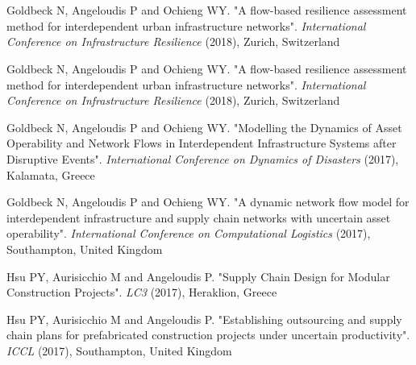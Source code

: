 \documentclass[margin]{res}
\begin{document}
\begin{resume}
\nocite{*}

\section{}
\printbibliography[heading=none,type=article,resetnumbers=true]

\section{}
\printbibliography[heading=none,type=book,resetnumbers=true]

\section{}
\begin{etaremune}
\renewcommand\labelenumi{C\theenumi. }
	\item
	{Goldbeck N, Angeloudis P and Ochieng WY}. "{A flow-based resilience assessment method for interdependent urban infrastructure networks}". \textit{International Conference on Infrastructure Resilience} (2018), Zurich, Switzerland
	\item
	{Goldbeck N, Angeloudis P and Ochieng WY}. "{A flow-based resilience assessment method for interdependent urban infrastructure networks}". \textit{International Conference on Infrastructure Resilience} (2018), Zurich, Switzerland
	\item
	{Goldbeck N, Angeloudis P and Ochieng WY}. "{Modelling the Dynamics of Asset Operability and Network Flows in Interdependent Infrastructure Systems after Disruptive Events}". \textit{International Conference on Dynamics of Disasters} (2017), Kalamata, Greece
	\item
	{Goldbeck N, Angeloudis P and Ochieng WY}. "{A dynamic network flow model for interdependent infrastructure and supply chain networks with uncertain asset operability}". \textit{International Conference on Computational Logistics} (2017), Southampton, United Kingdom
	\item
	{Hsu PY, Aurisicchio M and Angeloudis P}. "{Supply Chain Design for Modular Construction Projects}". \textit{LC3} (2017), Heraklion, Greece
	\item
	{Hsu PY, Aurisicchio M and Angeloudis P}. "{Establishing outsourcing and supply chain plans for prefabricated construction projects under uncertain productivity}". \textit{ICCL} (2017), Southampton, United Kingdom

\end{etaremune}
\end{resume}
\end{document}
